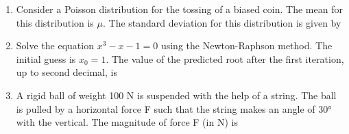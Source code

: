 \documentclass[journal,11pt,onecolumn]{IEEEtran}
\begin{document}
\begin{enumerate}
          \begin{enumerate}


          \end{enumerate}

    \item Consider a Poisson distribution for the tossing of a biased coin. The mean for this distribution is $\mu$. The standard deviation for this distribution is given by

          \begin{enumerate}


          \end{enumerate}

    \item Solve the equation $x^3 - x - 1 = 0$ using the Newton-Raphson method. The initial guess is $x_0 = 1$. The value of the predicted root after the first iteration, up to second decimal, is \underline{\hspace{2cm}}

    \item A rigid ball of weight 100 N is suspended with the help of a string. The ball is pulled by a horizontal force F such that the string makes an angle of 30° with the vertical. The magnitude of force F (in N) is \underline{\hspace{2cm}}


\end{enumerate}
\end{document}
